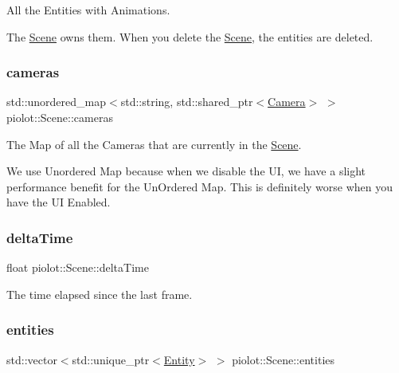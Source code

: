 All the Entities with Animations. 

The \mbox{\hyperlink{classpiolot_1_1_scene}{Scene}} owns them. When you delete the \mbox{\hyperlink{classpiolot_1_1_scene}{Scene}}, the entities are deleted. \mbox{\label{classpiolot_1_1_scene_a03ce910c0242bb786e797d54bbffd54f}} 
\subsubsection{\texorpdfstring{cameras}{cameras}}
{\footnotesize\ttfamily std\+::unordered\+\_\+map$<$std\+::string, std\+::shared\+\_\+ptr$<$\mbox{\hyperlink{classpiolot_1_1_camera}{Camera}}$>$ $>$ piolot\+::\+Scene\+::cameras\hspace{0.3cm}{\ttfamily [protected]}}



The Map of all the Cameras that are currently in the \mbox{\hyperlink{classpiolot_1_1_scene}{Scene}}. 

We use Unordered Map because when we disable the UI, we have a slight performance benefit for the Un\+Ordered Map. This is definitely worse when you have the UI Enabled. \mbox{\label{classpiolot_1_1_scene_ac3714002379b5e74cc24d947757f4af4}} 
\subsubsection{\texorpdfstring{delta\+Time}{deltaTime}}
{\footnotesize\ttfamily float piolot\+::\+Scene\+::delta\+Time\hspace{0.3cm}{\ttfamily [protected]}}



The time elapsed since the last frame. 

\mbox{\label{classpiolot_1_1_scene_ac85cd14260516aaaac3dacab4138a662}} 
\subsubsection{\texorpdfstring{entities}{entities}}
{\footnotesize\ttfamily std\+::vector$<$std\+::unique\+\_\+ptr$<$\mbox{\hyperlink{classpiolot_1_1_entity}{Entity}}$>$ $>$ piolot\+::\+Scene\+::entities\hspace{0.3cm}{\ttfamily [protected]}}



